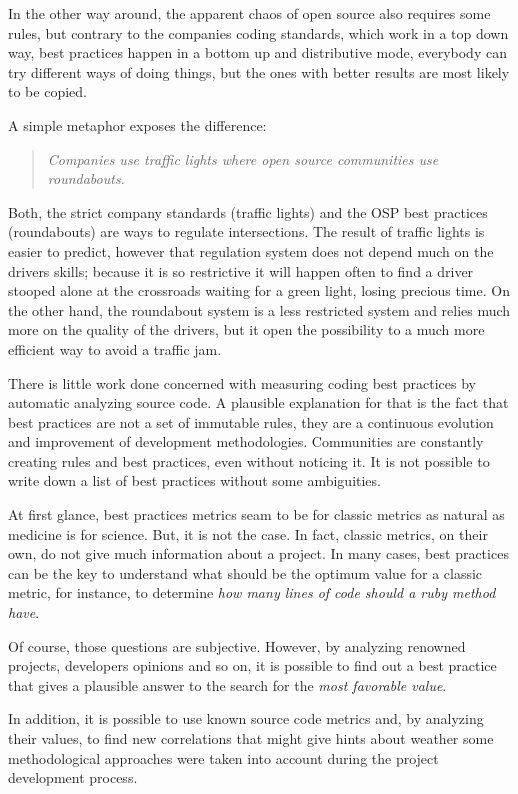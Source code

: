 In the other way around, the apparent chaos of open source also requires some rules,
but contrary to the companies coding standards, which work in a top down way,
best practices happen in a bottom up and distributive mode,
everybody can try different ways of doing things,
but the ones with better results are most likely to be copied.

A simple metaphor exposes the difference:
\begin{quote}\emph{
  Companies use traffic lights where open source communities use roundabouts.
}\end{quote}

Both, the strict company standards (traffic lights) and the OSP best practices (roundabouts) are ways to regulate intersections.
The result of traffic lights is  easier to predict, however that regulation  system does not depend much on the drivers skills;
because it is so restrictive it will happen often to find a driver stooped alone
at the crossroads waiting for a green light, losing precious time.
On the other hand, the roundabout system is a less restricted system and relies much more on the quality of the drivers,
but it open the possibility to a much more efficient way to avoid a traffic jam.

There is little work done concerned with measuring coding best practices by automatic analyzing source code.
A plausible explanation for that is the fact that best practices are not a set of immutable rules,
they are a continuous evolution and improvement of development methodologies.
Communities are constantly creating rules and best practices, even without noticing it.
It is not possible to write down a list of best practices without some ambiguities.

At first glance, best practices metrics seam to be for classic metrics as natural as medicine is for science.
But, it is not the case.
In fact, classic metrics, on their own, do not give much information about a project.
In many cases, best practices can be the key to understand what should be the optimum value for a classic metric,
for instance, to determine \emph{how many lines of code should a ruby method have}.

Of course, those questions are subjective.
However, by analyzing renowned projects, developers opinions and so on, it is possible to find out a best practice
that gives a plausible answer to the search for the \emph{most favorable value}.

In addition, it is possible to use known source code metrics and, by analyzing their values, 
to find new correlations that might give hints about weather some methodological approaches were 
taken into account during the project development process.

